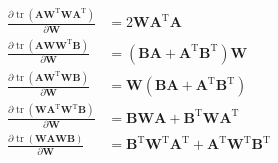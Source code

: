 \documentclass[UTF8,space=auto]{ctexart} %
\begin{document}
\begin{align}
\frac{\partial \operatorname{tr}\left(\mathbf{A} \mathbf{W}^{\mathrm{T}} \mathbf{W} \mathbf{A}^{\mathrm{T}}\right)}{\partial \mathbf{W}}&=2 \mathbf{W} \mathbf{A}^{\mathrm{T}} \mathbf{A} \\
\frac{\partial \operatorname{tr}\left(\mathbf{A} \mathbf{W} \mathbf{W}^{\mathrm{T}} \mathbf{B}\right)}{\partial \mathbf{W}}&=\left(\mathbf{B} \mathbf{A}+\mathbf{A}^{\mathrm{T}} \mathbf{B}^{\mathrm{T}}\right) \mathbf{W} \\
\frac{\partial \operatorname{tr}\left(\mathbf{A} \mathbf{W}^{\mathrm{T}} \mathbf{W} \mathbf{B}\right)}{\partial \mathbf{W}}&=\mathbf{W}\left(\mathbf{B} \mathbf{A}+\mathbf{A}^{\mathrm{T}} \mathbf{B}^{\mathrm{T}}\right) \\
\frac{\partial \operatorname{tr}\left(\mathbf{W A}^{\mathrm{T}} \mathbf{W}^{\mathrm{T}} \mathbf{B}\right)}{\partial \mathbf{W}}&=\mathbf{B} \mathbf{W} \mathbf{A}+\mathbf{B}^{\mathrm{T}} \mathbf{W} \mathbf{A}^{\mathrm{T}} \\
\frac{\partial \operatorname{tr}(\mathbf{W} \mathbf{A} \mathbf{W} \mathbf{B})}{\partial \mathbf{W}}&=\mathbf{B}^{\mathrm{T}} \mathbf{W}^{\mathrm{T}} \mathbf{A}^{\mathrm{T}}+\mathbf{A}^{\mathrm{T}} \mathbf{W}^{\mathrm{T}} \mathbf{B}^{\mathrm{T}}
\end{align}
\end{document}
